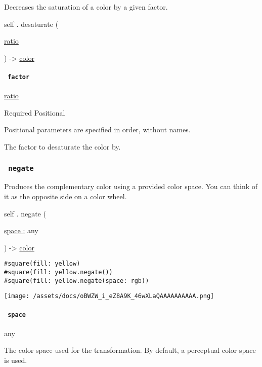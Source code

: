 Decreases the saturation of a color by a given factor.

self { . } { desaturate } (

{ \href{/docs/reference/layout/ratio/}{ratio} }

) -\textgreater{} \href{/docs/reference/visualize/color/}{color}

\paragraph{\texorpdfstring{\texttt{\ factor\ }}{ factor }}\label{definitions-desaturate-factor}

\href{/docs/reference/layout/ratio/}{ratio}

{Required} {{ Positional }}

\label{definitions-desaturate-factor-positional-tooltip}
Positional parameters are specified in order, without names.

The factor to desaturate the color by.

\subsubsection{\texorpdfstring{\texttt{\ negate\ }}{ negate }}\label{definitions-negate}

Produces the complementary color using a provided color space. You can
think of it as the opposite side on a color wheel.

self { . } { negate } (

{ \hyperref[definitions-negate-parameters-space]{space :} { any } }

) -\textgreater{} \href{/docs/reference/visualize/color/}{color}

\begin{verbatim}
#square(fill: yellow)
#square(fill: yellow.negate())
#square(fill: yellow.negate(space: rgb))
\end{verbatim}

\texttt{[image: /assets/docs/oBWZW\_i\_eZ8A9K\_46wXLaQAAAAAAAAAA.png]}

\paragraph{\texorpdfstring{\texttt{\ space\ }}{ space }}\label{definitions-negate-space}

{ any }

The color space used for the transformation. By default, a perceptual
color space is used.

